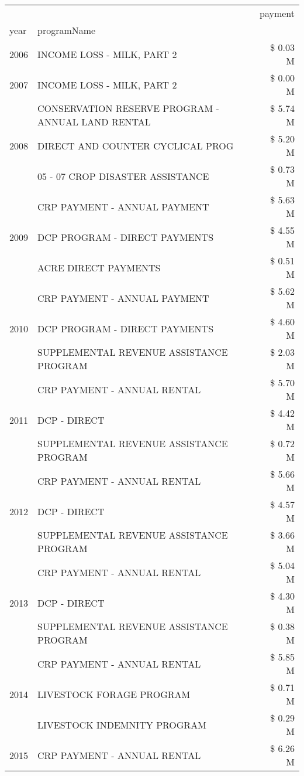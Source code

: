 \begin{tabular}{llr}
\toprule
 &  & payment \\
year & programName &  \\
\midrule
2006 & INCOME LOSS - MILK, PART 2 & \$ 0.03 M \\
\cline{1-3}
2007 & INCOME LOSS - MILK, PART 2 & \$ 0.00 M \\
\cline{1-3}
\multirow[t]{3}{*}{2008} & CONSERVATION RESERVE PROGRAM - ANNUAL LAND RENTAL & \$ 5.74 M \\
 & DIRECT AND COUNTER CYCLICAL PROG & \$ 5.20 M \\
 & 05 - 07 CROP DISASTER ASSISTANCE & \$ 0.73 M \\
\cline{1-3}
\multirow[t]{3}{*}{2009} & CRP PAYMENT - ANNUAL PAYMENT & \$ 5.63 M \\
 & DCP PROGRAM - DIRECT PAYMENTS & \$ 4.55 M \\
 & ACRE DIRECT PAYMENTS & \$ 0.51 M \\
\cline{1-3}
\multirow[t]{3}{*}{2010} & CRP PAYMENT - ANNUAL PAYMENT & \$ 5.62 M \\
 & DCP PROGRAM - DIRECT PAYMENTS & \$ 4.60 M \\
 & SUPPLEMENTAL REVENUE ASSISTANCE PROGRAM & \$ 2.03 M \\
\cline{1-3}
\multirow[t]{3}{*}{2011} & CRP PAYMENT - ANNUAL RENTAL & \$ 5.70 M \\
 & DCP - DIRECT & \$ 4.42 M \\
 & SUPPLEMENTAL REVENUE ASSISTANCE PROGRAM & \$ 0.72 M \\
\cline{1-3}
\multirow[t]{3}{*}{2012} & CRP PAYMENT - ANNUAL RENTAL & \$ 5.66 M \\
 & DCP - DIRECT & \$ 4.57 M \\
 & SUPPLEMENTAL REVENUE ASSISTANCE PROGRAM & \$ 3.66 M \\
\cline{1-3}
\multirow[t]{3}{*}{2013} & CRP PAYMENT - ANNUAL RENTAL & \$ 5.04 M \\
 & DCP - DIRECT & \$ 4.30 M \\
 & SUPPLEMENTAL REVENUE ASSISTANCE PROGRAM & \$ 0.38 M \\
\cline{1-3}
\multirow[t]{3}{*}{2014} & CRP PAYMENT - ANNUAL RENTAL & \$ 5.85 M \\
 & LIVESTOCK FORAGE PROGRAM & \$ 0.71 M \\
 & LIVESTOCK INDEMNITY PROGRAM & \$ 0.29 M \\
\cline{1-3}
\multirow[t]{3}{*}{2015} & CRP PAYMENT - ANNUAL RENTAL & \$ 6.26 M \\

\end{tabular}
